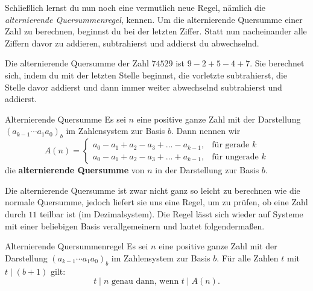 \documentclass[../../main.tex]{subfiles}
\begin{document}
Schließlich lernst du nun noch eine vermutlich neue Regel, nämlich die \emph{alternierende Quersummenregel}, kennen. Um die alternierende Quersumme einer Zahl zu berechnen, beginnst du bei der letzten Ziffer. Statt nun nacheinander alle Ziffern davor zu addieren, subtrahierst und addierst du abwechselnd.
\begin{advexample}{}
    Die alternierende Quersumme der Zahl $74529$ ist $9-2+5-4+7$. Sie berechnet sich, indem du mit der letzten Stelle beginnst, die vorletzte subtrahierst, die Stelle davor addierst und dann immer weiter abwechselnd subtrahierst und addierst.
\end{advexample}
\begin{definition}{Alternierende Quersumme}
    Es sei $n$ eine positive ganze Zahl mit der Darstellung $(a_{k-1}\cdots a_1a_0)_b$ im Zahlensystem zur Basis $b$. Dann nennen wir
    \[A(n)=\begin{cases}
        a_0-a_1+a_2-a_3+\dots-a_{k-1}, &\text{für gerade }k\\
        a_0-a_1+a_2-a_3+\dots+a_{k-1}, &\text{für ungerade }k
    \end{cases}\]
    die \textbf{alternierende Quersumme} von $n$ in der Darstellung zur Basis $b$.
\end{definition}
Die alternierende Quersumme ist zwar nicht ganz so leicht zu berechnen wie die normale Quersumme, jedoch liefert sie uns eine Regel, um zu prüfen, ob eine Zahl durch $11$ teilbar ist (im Dezimalsystem). Die Regel lässt sich wieder auf Systeme mit einer beliebigen Basis verallgemeinern und lautet folgendermaßen.
\begin{theorem}{Alternierende Quersummenregel}
    Es sei $n$ eine positive ganze Zahl mit der Darstellung $(a_{k-1}\cdots a_1a_0)_b$ im Zahlensystem zur Basis $b$. Für alle Zahlen $t$ mit $t\mid (b+1)$ gilt:
    \[t\mid n\text{ genau dann, wenn }t\mid A(n).\]
\end{theorem}
\end{document}
